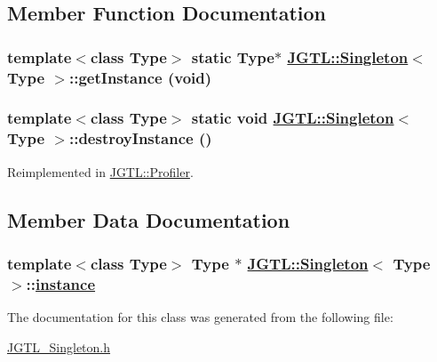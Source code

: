 \subsection{Member Function Documentation}
\hypertarget{class_j_g_t_l_1_1_singleton_ce18cf22abba60cac12ae26914ef3853}{
\subsubsection[getInstance]{\setlength{\rightskip}{0pt plus 5cm}template$<$class Type$>$ static Type$\ast$ \hyperlink{class_j_g_t_l_1_1_singleton}{JGTL::Singleton}$<$ Type $>$::get\-Instance (void)}}
\label{class_j_g_t_l_1_1_singleton_ce18cf22abba60cac12ae26914ef3853}


\hypertarget{class_j_g_t_l_1_1_singleton_59788c79ef7102b584b475aafc9e2315}{
\subsubsection[destroyInstance]{\setlength{\rightskip}{0pt plus 5cm}template$<$class Type$>$ static void \hyperlink{class_j_g_t_l_1_1_singleton}{JGTL::Singleton}$<$ Type $>$::destroy\-Instance ()}}
\label{class_j_g_t_l_1_1_singleton_59788c79ef7102b584b475aafc9e2315}




Reimplemented in \hyperlink{class_j_g_t_l_1_1_profiler_cb990d68355312b6cd7a1f494e4dd33c}{JGTL::Profiler}.

\subsection{Member Data Documentation}
\hypertarget{class_j_g_t_l_1_1_singleton_a3be92cc77155d83555fbecc5469135b}{
\subsubsection[instance]{\setlength{\rightskip}{0pt plus 5cm}template$<$class Type$>$ Type $\ast$ \hyperlink{class_j_g_t_l_1_1_singleton}{JGTL::Singleton}$<$ Type $>$::\hyperlink{class_j_g_t_l_1_1_singleton_a3be92cc77155d83555fbecc5469135b}{instance}}}
\label{class_j_g_t_l_1_1_singleton_a3be92cc77155d83555fbecc5469135b}




The documentation for this class was generated from the following file:\begin{CompactItemize}
\item 
\hyperlink{_j_g_t_l___singleton_8h}{JGTL\_\-Singleton.h}\end{CompactItemize}
